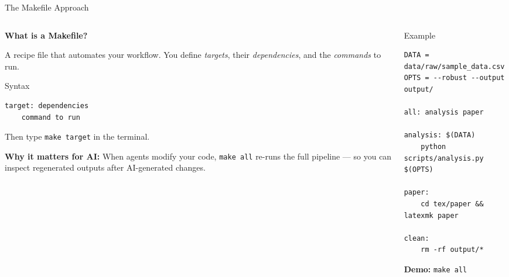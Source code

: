 \documentclass[11pt,aspectratio=169]{beamer}
\begin{document}
\begin{frame}[fragile]{The Makefile Approach}
\hypertarget{appendix-makefile}{}
\begin{columns}[t]
\begin{column}{0.48\textwidth}
\textbf{What is a Makefile?}

A recipe file that automates your workflow. You define \textit{targets}, their \textit{dependencies}, and the \textit{commands} to run.

\vspace{0.2cm}

\begin{block}{Syntax}
\begin{verbatim}
target: dependencies
    command to run
\end{verbatim}
\end{block}

Then type \texttt{make target} in the terminal.

\vspace{0.3cm}

\textbf{Why it matters for AI:} When agents modify your code, \texttt{make all} re-runs the full pipeline --- so you can inspect regenerated outputs after AI-generated changes.
\end{column}

\begin{column}{0.48\textwidth}
\begin{block}{Example}
\scriptsize
\begin{verbatim}
DATA = data/raw/sample_data.csv
OPTS = --robust --output output/

all: analysis paper

analysis: $(DATA)
    python scripts/analysis.py $(OPTS)

paper:
    cd tex/paper && latexmk paper

clean:
    rm -rf output/*
\end{verbatim}
\end{block}

\vspace{0.2cm}
\normalsize
\textbf{Demo:} \texttt{make all}
\end{column}
\end{columns}

\vspace{0.3cm}
\hyperlink{main-project-structure}{}
\end{frame}
\end{document}
